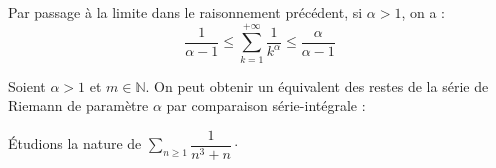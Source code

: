 \documentclass[a4paper,10pt]{report}
\newcommand{\Sum}[2]{\ensuremath{\textstyle{\sum\limits_{#1}^{#2}}}}
\begin{document}
\begin{rems}
\item Par passage à la limite dans le raisonnement précédent, si $\alpha>1$, on a :
$$ \frac{1}{\alpha-1} \leq \sum_{k=1}^{+ \infty} \frac{1}{k^{\alpha}} \leq  \frac{\alpha}{\alpha-1}$$
\item Soient $\alpha >1$ et $m \in \mathbb{N}$. On peut obtenir un équivalent des restes de la série de Riemann de paramètre $\alpha$ par comparaison série-intégrale :
%

\vspace{13cm}
\end{rems}

\begin{ex} Étudions la nature de $\Sum{n \geq 1}{} \dfrac{1}{n^3+n} \cdot$

\vspace{3cm}
\end{ex}
\end{document}
